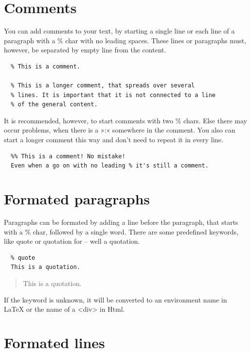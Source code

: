 \documentclass{article}
\begin{document}
\section{Comments}

You can add comments to your text, by starting a single line
or each line of a paragraph with a \% char with no leading
spaces. These lines or paragraphs must, however, be
separated by empty line from the content.

\begin{verbatim}
  % This is a comment.

  % This is a longer comment, that spreads over several
  % lines. It is important that it is not connected to a line
  % of the general content.

\end{verbatim}

It is recommended, however, to start comments with two \% chars.
Else there may occur problems, when there is a »:« somewhere
in the comment. You also can start a longer comment this way
and don't need to repeat it in every line.

\begin{verbatim}
  %% This is a comment! No mistake!
  Even when a go on with no leading % it's still a comment.

\end{verbatim}


\section{Formated paragraphs}

Paragraphs can be formated by adding a line before the
paragraph, that starts with a \% char, followed by a single
word. There are some predefined keywords, like quote or
quotation for – well a quotation.

\begin{verbatim}
  % quote
  This is a quotation.

\end{verbatim}

\begin{quote}
This is a quotation.

\end{quote}

If the keyword is unknown, it will be converted to an environment
name in LaTeX or the name of a <div> in Html.

\section{Formated lines}
\end{document}
